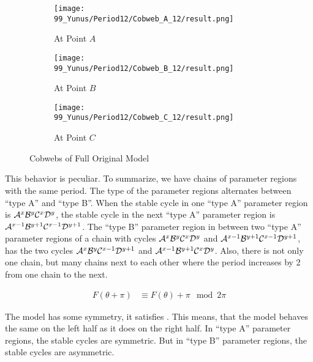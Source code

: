 \begin{figure}
	\centering
	\begin{subfigure}{0.3\textwidth}
		\centering
		\texttt{[image: 99\_Yunus/Period12/Cobweb\_A\_12/result.png]}
		\caption{At Point $A$}
		\label{fig:yunus.2pi.CobwebA12}
	\end{subfigure}
	\begin{subfigure}{0.3\textwidth}
		\centering
		\texttt{[image: 99\_Yunus/Period12/Cobweb\_B\_12/result.png]}
		\caption{At Point $B$}
		\label{fig:yunus.2pi.CobwebB12}
	\end{subfigure}
	\begin{subfigure}{0.3\textwidth}
		\centering
		\texttt{[image: 99\_Yunus/Period12/Cobweb\_C\_12/result.png]}
		\caption{At Point $C$}
		\label{fig:yunus.2pi.CobwebC12}
	\end{subfigure}
	\caption{Cobwebs of Full Original Model}
\end{figure}

This behavior is peculiar.
To summarize, we have chains of parameter regions with the same period.
The type of the parameter regions alternates between ``type A'' and ``type B''.
When the stable cycle in one ``type A'' parameter region is $\mathcal{A}^x\mathcal{B}^y\mathcal{C}^x\mathcal{D}^y$, the stable cycle in the next ``type A'' parameter region is $\mathcal{A}^{x-1}\mathcal{B}^{y+1}\mathcal{C}^{x-1}\mathcal{D}^{y+1}$.
The ``type B'' parameter region in between two ``type A'' parameter regions of a chain with cycles $\mathcal{A}^x\mathcal{B}^y\mathcal{C}^x\mathcal{D}^y$ and $\mathcal{A}^{x-1}\mathcal{B}^{y+1}\mathcal{C}^{x-1}\mathcal{D}^{y+1}$, has the two cycles $\mathcal{A}^x\mathcal{B}^y\mathcal{C}^{x-1}\mathcal{D}^{y+1}$ and $\mathcal{A}^{x-1}\mathcal{B}^{y+1}\mathcal{C}^x\mathcal{D}^y$.
Also, there is not only one chain, but many chains next to each other where the period increases by 2 from one chain to the next.

\begin{align}
	F(\theta + \pi) & \equiv F(\theta) + \pi \mod 2 \pi \label{equ:state.og.sym}
\end{align}

The model has some symmetry, it satisfies .
This means, that the model behaves the same on the left half as it does on the right half.
In ``type A'' parameter regions, the stable cycles are symmetric.
But in ``type B'' parameter regions, the stable cycles are asymmetric.

